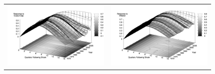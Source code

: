 \documentclass[10pt]{article}
\begin{document}
{\begin{figure}
\begin{tabular}{cc}
\includegraphics[scale=0.12]{images/Irf16_Output_Gap_Inflation_Judgment_Shock.png} & \includegraphics[scale=0.12]{images/Irf16_Inflation_Inflation_Judgment_Shock.png} \\
\end{tabular}
\end{figure}

}
\end{document}
